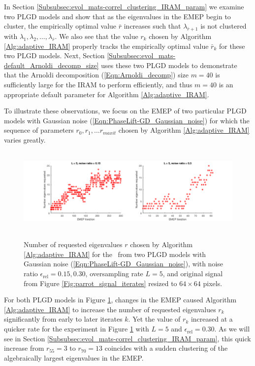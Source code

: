 In Section \ref{Subsubsec:evol_mats-correl_clustering_IRAM_param} we examine two PLGD models and show that as the eigenvalues in the EMEP begin to cluster, the empirically optimal value $\bar{r}$ increases such that $\lambda_{\bar{r}+1}$ is not clustered with $\lambda_1, \lambda_2, \ldots, \lambda_{\bar{r}}$.
We also see that the value $r_k$ chosen by Algorithm \ref{Alg:adaptive_IRAM} properly tracks the empirically optimal value $\bar{r}_k$ for these two PLGD models.
Next, Section \ref{Subsubsec:evol_mats-default_Arnoldi_decomp_size} uses these two PLGD models to demonstrate that the Arnoldi decomposition (\ref{Eqn:Arnoldi_decomp}) size $m=40$ is sufficiently large for the IRAM to perform efficiently, and thus $m=40$ is an appropriate default parameter for Algorithm \ref{Alg:adaptive_IRAM}.





To illustrate these observations, we focus on the EMEP of two particular PLGD models with Gaussian noise (\ref{Eqn:PhaseLift-GD_Gaussian_noise}) for which the sequence of parameters $r_0, r_1, \ldots r_{maxit}$ chosen by Algorithm \ref{Alg:adaptive_IRAM} varies greatly.

\begin{figure}[H]
\centering
\hbox{\hspace{-1.1cm} \includegraphics[scale=0.6]{Numerics-num_eigs_req_ada_2_exps} }\vspace{0.0cm}
	\caption{
Number of requested eigenvalues $r$ chosen by Algorithm \ref{Alg:adaptive_IRAM} for the \emep \ from two PLGD models with Gaussian noise (\ref{Eqn:PhaseLift-GD_Gaussian_noise}), with noise ratio $\epsilon_\text{rel}=0.15, 0.30$, oversampling rate $L=5$, and original signal from Figure \ref{Fig:parrot_signal_iterates} resized to $64 \times 64$ pixels.
}
\label{Fig:Numerics-num_req_eigs_2_exps}
\end{figure}



For both PLGD models in Figure \ref{Fig:Numerics-num_req_eigs_2_exps}, changes in the EMEP caused Algorithm \ref{Alg:adaptive_IRAM} to increase the number of requested eigenvalues $r_k$ significantly from early to later iterates $k$.
Yet the value of $r_k$ increased at a quicker rate for the experiment in Figure \ref{Fig:Numerics-num_req_eigs_2_exps} with $L=5$ and $\epsilon_\text{rel} = 0.30$.
As we will see in Section \ref{Subsubsec:evol_mats-correl_clustering_IRAM_param}, this quick increase from $r_{55}=3$ to $r_{70}=13$ coincides with a sudden clustering of the algebraically largest eigenvalues in the EMEP.





